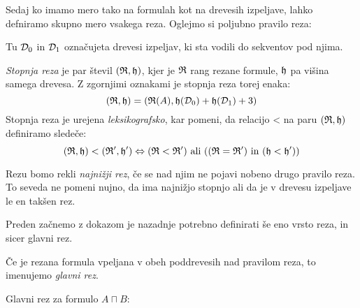 Sedaj ko imamo mero tako na formulah kot na drevesih izpeljave, lahko defniramo skupno mero vsakega reza. Oglejmo si poljubno pravilo reza:
\begin{prooftree} \label{rez general}


\end{prooftree}
Tu $\D_0$ in $\D_1$ označujeta drevesi izpeljav, ki sta vodili do sekventov pod njima.

\begin{definicija} \label{stopnja}
    \emph{Stopnja reza} je par števil $(\R,\h)$, kjer je $\R$ rang rezane formule, $\h$ pa višina samega drevesa. Z zgornjimi oznakami je stopnja reza torej enaka:
    $$
    (\R,\h) = (\R(A), \h(\D_0) +\h(\D_1) + 3)
    $$
    Stopnja reza je urejena \emph{leksikografsko}, kar pomeni, da relacijo < na paru $(\R,\h)$ definiramo sledeče:
    $$
    (\R,\h) < (\R',\h') \Leftrightarrow (\R < \R') \text{ ali } ((\R = \R') \text{ in } (\h < \h'))
    $$
\end{definicija}
\begin{definicija} \label{najnizji}
    Rezu bomo rekli \emph{najnižji rez}, če se nad njim ne pojavi nobeno drugo pravilo reza. To seveda ne pomeni nujno, da ima najnižjo stopnjo ali da je v drevesu izpeljave le en takšen rez.
\end{definicija}

Preden začnemo z dokazom je nazadnje potrebno definirati še eno vrsto reza, in sicer glavni rez.

\begin{definicija} \label{gl rez}
    Če je rezana formula vpeljana v obeh poddrevesih nad pravilom reza, to imenujemo \emph{glavni rez}.
\end{definicija}

\begin{primer*} \label{gl rez in}
    Glavni rez za formulo $A \sqcap B$:
    \begin{prooftree}


    \end{prooftree}
\end{primer*}
